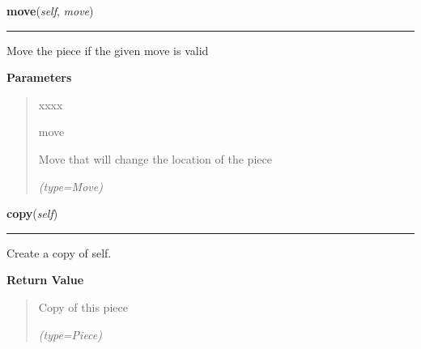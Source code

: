     \label{UnBlockMeSolver:Map:Piece:Piece:move}

    \vspace{0.5ex}

\hspace{.8\funcindent}\begin{boxedminipage}{\funcwidth}

    \raggedright \textbf{move}(\textit{self}, \textit{move})

    \vspace{-1.5ex}

    \rule{\textwidth}{0.5\fboxrule}
\setlength{\parskip}{2ex}
    Move the piece if the given move is valid

\setlength{\parskip}{1ex}
      \textbf{Parameters}
      \vspace{-1ex}

      \begin{quote}
        \begin{Ventry}{xxxx}

          \item[move]

          Move that will change the location of the piece

            {\it (type=Move)}

        \end{Ventry}

      \end{quote}

    \end{boxedminipage}

    \label{UnBlockMeSolver:Map:Piece:Piece:copy}

    \vspace{0.5ex}

\hspace{.8\funcindent}\begin{boxedminipage}{\funcwidth}

    \raggedright \textbf{copy}(\textit{self})

    \vspace{-1.5ex}

    \rule{\textwidth}{0.5\fboxrule}
\setlength{\parskip}{2ex}
    Create a copy of self.

\setlength{\parskip}{1ex}
      \textbf{Return Value}
    \vspace{-1ex}

      \begin{quote}
      Copy of this piece

      {\it (type=Piece)}

      \end{quote}

    \end{boxedminipage}


